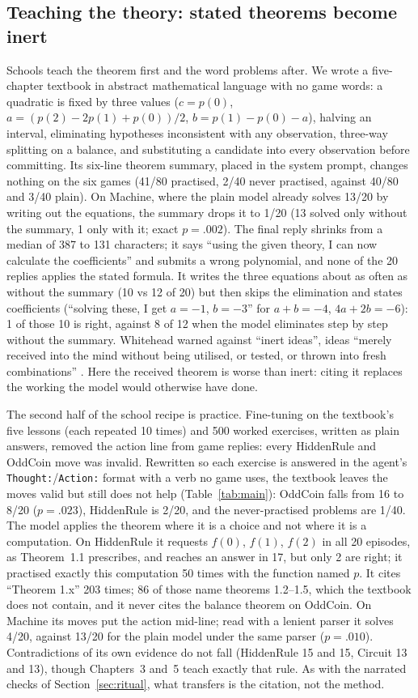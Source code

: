 \documentclass[11pt]{article}
\begin{document}
\subsection{Teaching the theory: stated theorems become inert}
Schools teach the theorem first and the word problems after. We wrote a five-chapter textbook in abstract
mathematical language with no game words: a quadratic is fixed by three values ($c=p(0)$,
$a=(p(2)-2p(1)+p(0))/2$, $b=p(1)-p(0)-a$), halving an interval, eliminating hypotheses inconsistent with any
observation, three-way splitting on a balance, and substituting a candidate into every observation before
committing. Its six-line theorem summary, placed in the system prompt, changes nothing on the six games (41/80
practised, 2/40 never practised, against 40/80 and 3/40 plain). On Machine, where the plain model already solves 13/20 by
writing out the equations, the summary drops it to 1/20 (13 solved only without the summary, 1 only with it;
exact $p=.002$). The final reply shrinks from a median of 387 to 131 characters; it says ``using the given
theory, I can now calculate the coefficients'' and submits a wrong polynomial, and none of the 20 replies applies
the stated formula. It writes the three equations about as often as without the summary (10 vs 12 of 20) but then
skips the elimination and states coefficients (``solving these, I get $a=-1$, $b=-3$'' for $a+b=-4$, $4a+2b=-6$):
1 of those 10 is right, against 8 of 12 when the model eliminates step by step without the summary.
Whitehead warned against ``inert ideas'', ideas ``merely received into the mind without being utilised, or tested,
or thrown into fresh combinations'' \citep{whitehead1929}. Here the received theorem is worse than inert: citing it
replaces the working the model would otherwise have done.

The second half of the school recipe is practice. Fine-tuning on the textbook's five lessons (each repeated 10 times) and 500 worked
exercises, written as plain answers, removed the action line from game replies: every HiddenRule and OddCoin move
was invalid. Rewritten so each exercise is answered in the agent's \texttt{Thought:}/\texttt{Action:} format with a
verb no game uses, the textbook leaves the moves valid but still does not help (Table~\ref{tab:main}): OddCoin falls
from 16 to 8/20 ($p=.023$), HiddenRule is 2/20, and the never-practised problems are 1/40. The model applies the theorem
where it is a choice and not where it is a computation. On HiddenRule it requests $f(0)$, $f(1)$, $f(2)$ in all 20
episodes, as Theorem~1.1 prescribes, and reaches an answer in 17, but only 2 are right; it practised exactly this
computation 50 times with the function named $p$. It cites ``Theorem 1.x'' 203 times; 86 of those name theorems
1.2--1.5, which the textbook does not contain, and it never cites the balance theorem on OddCoin. On Machine its moves
put the action mid-line; read with a lenient parser it solves 4/20, against 13/20 for the plain model under the same parser ($p=.010$). Contradictions
of its own evidence do not fall (HiddenRule 15 and 15, Circuit 13 and 13), though Chapters~3 and~5 teach exactly
that rule. As with the narrated checks of Section~\ref{sec:ritual}, what transfers is the citation, not the method.
\end{document}
